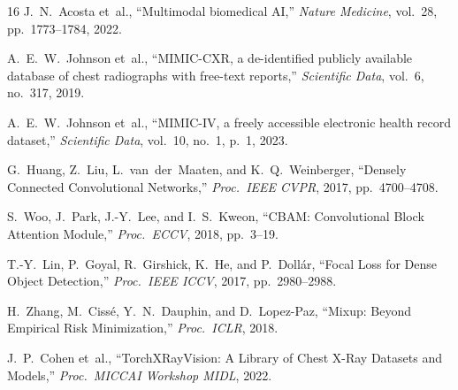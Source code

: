 \documentclass[conference]{IEEEtran}
\begin{document}
{\begin{thebibliography}{16}
J.~N.~Acosta et~al., ``Multimodal biomedical AI,'' \emph{Nature Medicine}, vol.~28, pp.~1773--1784, 2022.

A.~E.~W.~Johnson et~al., ``MIMIC-CXR, a de-identified publicly available database of chest radiographs with free-text reports,'' \emph{Scientific Data}, vol.~6, no.~317, 2019.

A.~E.~W.~Johnson et~al., ``MIMIC-IV, a freely accessible electronic health record dataset,'' \emph{Scientific Data}, vol.~10, no.~1, p.~1, 2023.

G.~Huang, Z.~Liu, L.~van~der~Maaten, and K.~Q.~Weinberger, ``Densely Connected Convolutional Networks,'' \emph{Proc.\ IEEE CVPR}, 2017, pp.~4700--4708.

S.~Woo, J.~Park, J.-Y.~Lee, and I.~S.~Kweon, ``CBAM: Convolutional Block Attention Module,'' \emph{Proc.\ ECCV}, 2018, pp.~3--19.

T.-Y.~Lin, P.~Goyal, R.~Girshick, K.~He, and P.~Doll{\'a}r, ``Focal Loss for Dense Object Detection,'' \emph{Proc.\ IEEE ICCV}, 2017, pp.~2980--2988.

H.~Zhang, M.~Ciss{\'e}, Y.~N.~Dauphin, and D.~Lopez-Paz, ``Mixup: Beyond Empirical Risk Minimization,'' \emph{Proc.\ ICLR}, 2018.

J.~P.~Cohen et~al., ``TorchXRayVision: A Library of Chest X-Ray Datasets and Models,'' \emph{Proc.\ MICCAI Workshop MIDL}, 2022.

\end{thebibliography}
}
\end{document}
